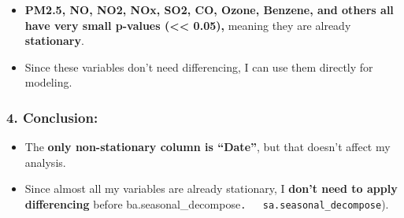 \documentclass[11pt]{article}
\providecommand{\tightlist}{%
      \setlength{\itemsep}{0pt}\setlength{\parskip}{0pt}}
\begin{document}
\begin{itemize}
\tightlist
\item
  \textbf{PM2.5, NO, NO2, NOx, SO2, CO, Ozone, Benzene, and others all
  have very small p-values (\textless\textless{} 0.05),} meaning they
  are already \textbf{stationary}.\\
\item
  Since these variables don't need differencing, I can use them directly
  for modeling.
\end{itemize}

\hypertarget{conclusion}{%
\subsubsection{\texorpdfstring{\textbf{4.
Conclusion:}}{4. Conclusion:}}\label{conclusion}}

\begin{itemize}
\tightlist
\item
  The \textbf{only non-stationary column is ``Date''}, but that doesn't
  affect my analysis.\\
\item
  Since almost all my variables are already stationary, I \textbf{don't
  need to apply differencing} before
  ba.seasonal\_decompose\texttt{.\ \ \ sa.seasonal\_decompose}).
\end{itemize}
\end{document}
